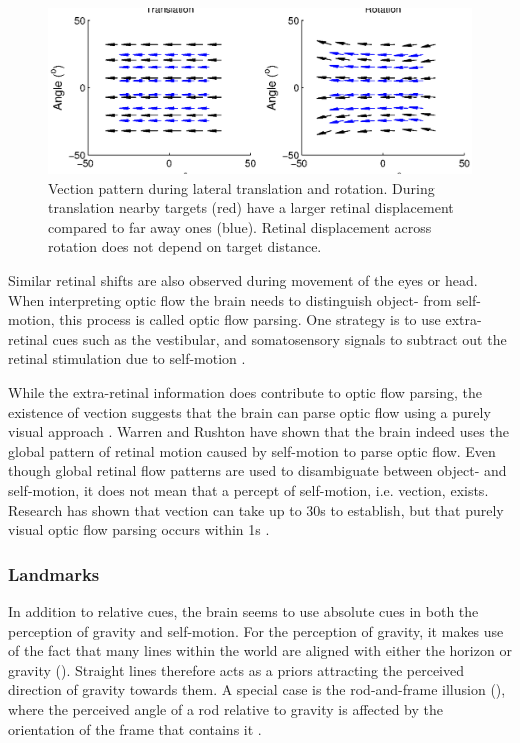 \begin{figure}
    \includegraphics[width=1.0\textwidth]{src/intro/figures/optic_flow.eps}

    \caption{Vection pattern during  lateral translation and  rotation. During translation nearby targets (red) have a larger retinal displacement compared to far away ones (blue). Retinal displacement across rotation does not depend on target distance. }
    \label{intro:fig:vection}
\end{figure}

Similar retinal shifts are also observed during movement of the eyes or head. When interpreting optic flow the brain needs to distinguish object- from self-motion, this process is called optic flow parsing. One strategy is to use extra-retinal cues such as the vestibular, and somatosensory signals to subtract out the retinal stimulation due to self-motion \cite{wertheim1994,wexler2001,macneilage2012}.

While the extra-retinal information does contribute to optic flow parsing, the existence of vection \cite{dichgans1978} suggests that the brain can parse optic flow using a purely visual approach \cite{rushton2005,warren2007}. Warren and Rushton \citeyear{warren2009} have shown that the brain indeed uses the global pattern of retinal motion caused by self-motion to parse optic flow. Even though global retinal flow patterns are used to disambiguate between object- and self-motion, it does not mean that a percept of self-motion, i.e. vection, exists. Research has shown that vection can take up to 30s to establish, but that purely visual optic flow parsing occurs within 1s \cite{warren2009}.

\subsubsection{Landmarks}
In addition to relative cues, the brain seems to use absolute cues in both the perception of gravity and self-motion. For the perception of gravity, it makes use of the fact that many lines within the world are aligned with either the horizon or gravity (). Straight lines therefore acts as a priors attracting the perceived direction of gravity towards them. A special case is the rod-and-frame illusion (), where the perceived angle of a rod relative to gravity is affected by the orientation of the frame that contains it \cite{witkin1948}. 


